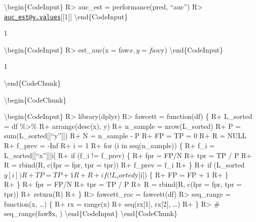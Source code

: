 \documentclass[article]{jss}
\begin{document}
\textbackslash{}begin\{CodeInput\} R\textgreater{} auc\_est =
performance(pred, ``auc'') R\textgreater{}
\href{mailto:auc_est@y.values}{\nolinkurl{auc\_est@y.values}}{[}{[}1{]}{]}
\textbackslash{}end\{CodeInput\}

\begin{CodeOutput}
[1] 1
\end{CodeOutput}

\textbackslash{}begin\{CodeInput\} R\textgreater{} est\_auc(x =
faw\(x, y = faw\)y) \textbackslash{}end\{CodeInput\}

\begin{CodeOutput}
[1] 1
\end{CodeOutput}

\textbackslash{}end\{CodeChunk\}

\textbackslash{}begin\{CodeChunk\}

\textbackslash{}begin\{CodeInput\} R\textgreater{} library(dplyr)
R\textgreater{} fawcett = function(df) \{ R+ L\_sorted = df
\%\textgreater{}\% R+ arrange(desc(x), y) R+ n\_sample = nrow(L\_sorted)
R+ P = sum(L\_sorted{[}{[}``y''{]}{]}) R+ N = n\_sample - P R+ FP = TP =
0 R+ R = NULL R+ f\_prev = -Inf R+ i = 1 R+ for (i in seq(n\_sample)) \{
R+ f\_i = L\_sorted{[}{[}``x''{]}{]}{[}i{]} R+ if (f\_i != f\_prev) \{
R+ fpr = FP/N R+ tpr = TP / P R+ R = rbind(R, c(fpr = fpr, tpr = tpr))
R+ f\_prev = f\_i R+ \} R+ if
(L\_sorted\(y[i]) { R+ TP = TP + 1 R+ } R+ if (!L_sorted\)y{[}i{]}) \{
R+ FP = FP + 1 R+ \}\\
R+ \} R+ fpr = FP/N R+ tpr = TP / P R+ R = rbind(R, c(fpr = fpr, tpr =
tpr)) R+ return(R) R+ \} R\textgreater{} fawcett\_roc = fawcett(df)
R\textgreater{} seq\_range = function(x, \ldots{}) \{ R+ rx = range(x)
R+ seq(rx{[}1{]}, rx{[}2{]}, \ldots{}) R+ \} R\textgreater{} \#
seq\_range(faw\$x, ) \textbackslash{}end\{CodeInput\}
\textbackslash{}end\{CodeChunk\}


\end{document}

